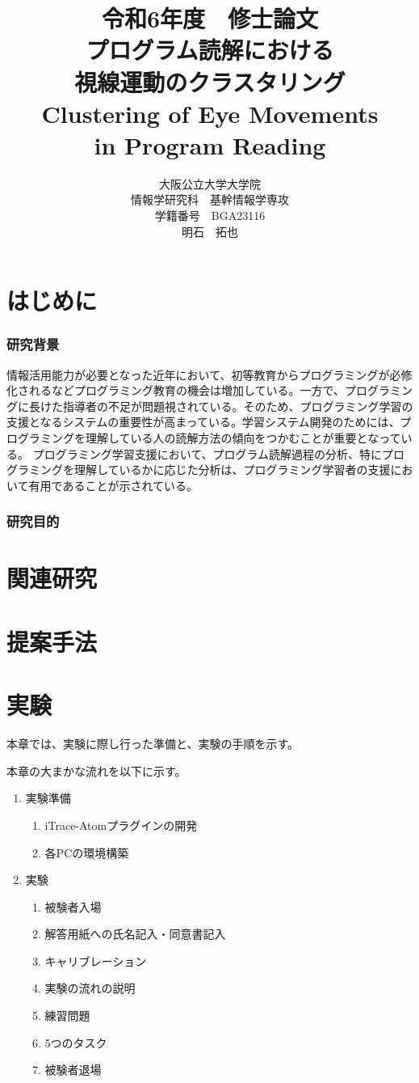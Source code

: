 \documentclass[paper=a4paper,fontsize=10pt]{jlreq}
\title{\huge 令和6年度　修士論文\\\vspace{100truept}プログラム読解における\\視線運動のクラスタリング\\
Clustering of Eye Movements\\ in Program Reading}
\author{\large 大阪公立大学大学院　\\情報学研究科　基幹情報学専攻\\学籍番号　BGA23116\\明石　拓也}
\begin{document}
\maketitle
\clearpage

\tableofcontents
\clearpage

\part{はじめに}
  \section{研究背景}
  情報活用能力が必要となった近年において、初等教育からプログラミングが必修化されるなどプログラミング教育の機会は増加している。一方で、プログラミングに長けた指導者の不足が問題視されている。そのため、プログラミング学習の支援となるシステムの重要性が高まっている。学習システム開発のためには、プログラミングを理解している人の読解方法の傾向をつかむことが重要となっている。
  プログラミング学習支援において、プログラム読解過程の分析、特にプログラミングを理解しているかに応じた分析は、プログラミング学習者の支援において有用であることが示されている。
    

  \section{研究目的}


\part{関連研究}


\part{提案手法}


\part{実験}
  本章では、実験に際し行った準備と、実験の手順を示す。
  
  本章の大まかな流れを以下に示す。
  \begin{enumerate}
    \item 実験準備
      \begin{enumerate}
        \item iTrace-Atomプラグインの開発
        \item 各PCの環境構築
      \end{enumerate}
    \item 実験
      \begin{enumerate}
        \item 被験者入場
        \item 解答用紙への氏名記入・同意書記入
        \item キャリブレーション
        \item 実験の流れの説明
        \item 練習問題
        \item 5つのタスク
        \item 被験者退場
      \end{enumerate}
  \end{enumerate}
\end{document}
